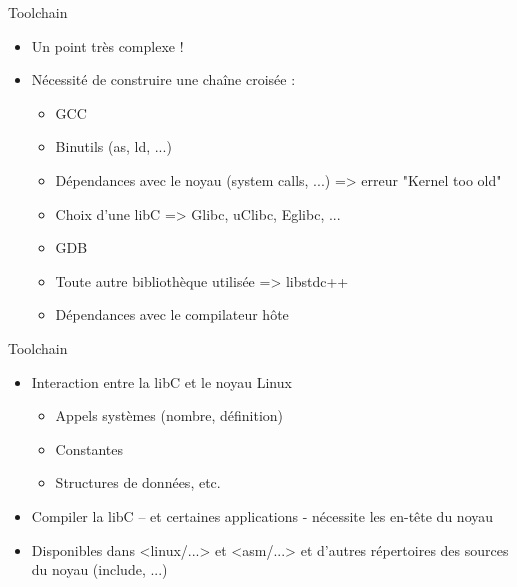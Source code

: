 \begin{frame}{Toolchain}{}
  \begin{itemize}
  \item Un point très complexe !
  \item Nécessité de construire une chaîne croisée :
    \begin{itemize}
    \item GCC
    \item Binutils (as, ld, ...)
    \item Dépendances avec le noyau (system calls, ...) => erreur "Kernel too old"
    \item Choix d'une libC => Glibc, uClibc, Eglibc, ...
    \item GDB
    \item Toute autre bibliothèque utilisée => libstdc++
    \item Dépendances avec le compilateur hôte
    \end{itemize}
  \end{itemize}
\end{frame}

\begin{frame}{Toolchain}{}
  \begin{itemize}
  \item Interaction entre la libC et le noyau Linux
    \begin{itemize}
    \item Appels systèmes (nombre, définition)
    \item Constantes
    \item Structures de données, etc.
    \end{itemize}
  \item Compiler la libC – et certaines applications - nécessite les en-tête du noyau
  \item Disponibles dans <linux/...> et <asm/...> et d'autres répertoires des sources du noyau (include, ...)
  \end{itemize}
\end{frame}

